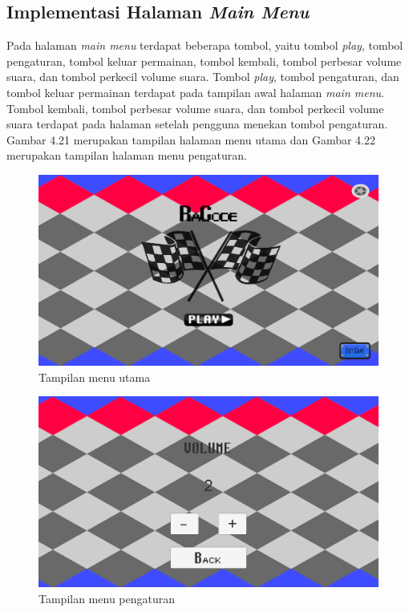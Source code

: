 	\subsection{Implementasi Halaman \textit{Main Menu}}
	Pada halaman \textit{main menu} terdapat beberapa tombol, yaitu tombol \textit{play}, tombol pengaturan, tombol keluar permainan, tombol kembali, tombol perbesar volume suara, dan tombol perkecil volume suara. Tombol \textit{play}, tombol pengaturan, dan tombol keluar permainan terdapat pada tampilan awal halaman \textit{main menu}. Tombol kembali, tombol perbesar volume suara, dan tombol perkecil volume suara terdapat pada halaman setelah pengguna menekan tombol pengaturan. Gambar 4.21 merupakan tampilan halaman menu utama dan Gambar 4.22 merupakan tampilan halaman menu pengaturan.
	\begin{figure}
		\centering
		\includegraphics[width=\linewidth-40pt]{pics/prototipe/menu1}
		\caption{Tampilan menu utama}
	\end{figure}
	\begin{figure}
		\centering
		\includegraphics[width=\linewidth-40pt]{pics/prototipe/menu2}
		\caption{Tampilan menu pengaturan}
	\end{figure}
